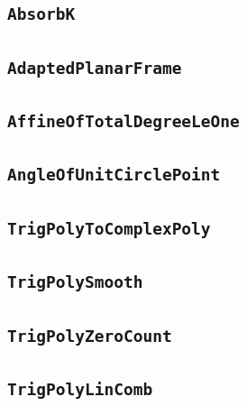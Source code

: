 \documentclass[11pt]{amsart}
\theoremstyle{definition}
\begin{document}
\subsection{\texorpdfstring{\texttt{AbsorbK}}{AbsorbK}}\label{node:AbsorbK}


\subsection{\texorpdfstring{\texttt{AdaptedPlanarFrame}}{AdaptedPlanarFrame}}\label{node:AdaptedPlanarFrame}


\subsection{\texorpdfstring{\texttt{AffineOfTotalDegreeLeOne}}{AffineOfTotalDegreeLeOne}}\label{node:AffineOfTotalDegreeLeOne}


\subsection{\texorpdfstring{\texttt{AngleOfUnitCirclePoint}}{AngleOfUnitCirclePoint}}\label{node:AngleOfUnitCirclePoint}


\subsection{\texorpdfstring{\texttt{TrigPolyToComplexPoly}}{TrigPolyToComplexPoly}}\label{node:TrigPolyToComplexPoly}


\subsection{\texorpdfstring{\texttt{TrigPolySmooth}}{TrigPolySmooth}}\label{node:TrigPolySmooth}


\subsection{\texorpdfstring{\texttt{TrigPolyZeroCount}}{TrigPolyZeroCount}}\label{node:TrigPolyZeroCount}


\subsection{\texorpdfstring{\texttt{TrigPolyLinComb}}{TrigPolyLinComb}}\label{node:TrigPolyLinComb}

\end{document}
